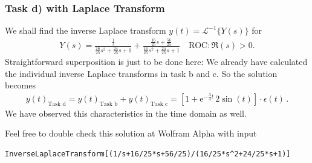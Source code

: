 \documentclass[11pt,a4paper,DIV=12]{scrartcl}
\begin{document}
\subsubsection{Task d) with Laplace Transform}
We shall find the inverse Laplace transform $y(t) = \mathcal{L}^{-1}\{Y(s)\}$
for
\begin{align}
Y(s) = \frac{\frac{1}{s}}{\frac{16}{25} s^2 + \frac{24}{25} s + 1}+
\frac{\frac{16}{25} s + \frac{56}{25}}{\frac{16}{25} s^2 + \frac{24}{25} s + 1}
\quad \text{ROC}: \Re(s) > 0.
\end{align}
Straightforward superposition is just to be done here:
We already have calculated the individual inverse Laplace transforms in task b
and c. So the solution becomes
\begin{align}
\boxed{y(t)_\text{Task d} = y(t)_\text{Task b} + y(t)_\text{Task c}
= \left[1+\mathrm{e}^{-\frac{3}{4} t} \, 2 \sin(t) \right] \cdot \epsilon(t)
}\,.
\end{align}
We have observed this characteristics in the time domain as well.

Feel free to double check this solution at Wolfram Alpha with input
\begin{verbatim}
InverseLaplaceTransform[(1/s+16/25*s+56/25)/(16/25*s^2+24/25*s+1)]
\end{verbatim}


\end{document}
